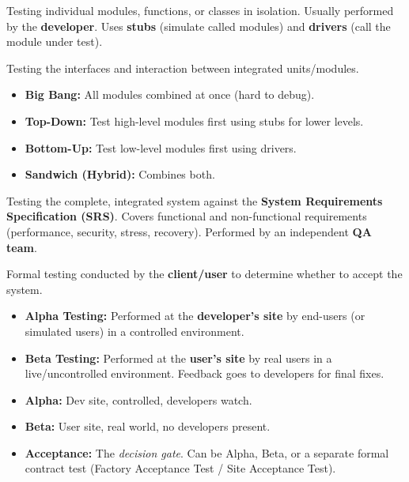 \documentclass[11pt]{article}
\begin{document}
\begin{definition}
Testing individual modules, functions, or classes in isolation. Usually performed by the \textbf{developer}. Uses \textbf{stubs} (simulate called modules) and \textbf{drivers} (call the module under test).
\end{definition}

\begin{definition}
Testing the interfaces and interaction between integrated units/modules.
\begin{itemize}
    \item \textbf{Big Bang:} All modules combined at once (hard to debug).
    \item \textbf{Top-Down:} Test high-level modules first using stubs for lower levels.
    \item \textbf{Bottom-Up:} Test low-level modules first using drivers.
    \item \textbf{Sandwich (Hybrid):} Combines both.
\end{itemize}
\end{definition}

\begin{definition}
Testing the complete, integrated system against the \textbf{System Requirements Specification (SRS)}. Covers functional and non-functional requirements (performance, security, stress, recovery). Performed by an independent \textbf{QA team}.
\end{definition}

\begin{definition}
Formal testing conducted by the \textbf{client/user} to determine whether to accept the system.
\begin{itemize}
    \item \textbf{Alpha Testing:} Performed at the \textbf{developer's site} by end-users (or simulated users) in a controlled environment.
    \item \textbf{Beta Testing:} Performed at the \textbf{user's site} by real users in a live/uncontrolled environment. Feedback goes to developers for final fixes.
\end{itemize}
\end{definition}

\begin{aretenir}
\begin{itemize}
    \item \textbf{Alpha:} Dev site, controlled, developers watch.
    \item \textbf{Beta:} User site, real world, no developers present.
    \item \textbf{Acceptance:} The \emph{decision gate}. Can be Alpha, Beta, or a separate formal contract test (Factory Acceptance Test / Site Acceptance Test).
\end{itemize}
\end{aretenir}
\end{document}

